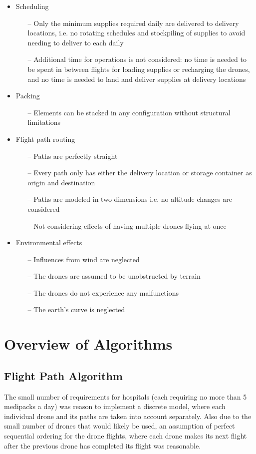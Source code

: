 \documentclass[twocolumn,10pt]{asme2ej}
\begin{document}
\begin{itemize}
	\item Scheduling
	\begin{itemize}
		\item[--] Only the minimum supplies required daily are delivered to delivery locations, i.e. no rotating schedules and stockpiling of supplies to avoid needing to deliver to each daily
		\item[--] Additional time for operations is not considered: no time is needed to be spent in between flights for loading supplies or recharging the drones, and no time is needed to land and deliver supplies at delivery locations
	\end{itemize}
    \item Packing
    \begin{itemize}
    	\item[--] Elements can be stacked in any configuration without structural limitations
    \end{itemize}
	\item Flight path routing
	\begin{itemize}
		\item[--] Paths are perfectly straight
		\item[--] Every path only has either the delivery location or storage container as origin and destination
		\item[--] Paths are modeled in two dimensions i.e. no altitude changes are considered
		\item[--] Not considering effects of having multiple drones flying at once
	\end{itemize}
	\item Environmental effects
	\begin{itemize}
		\item[--] Influences from wind are neglected
		\item[--] The drones are assumed to be unobstructed by terrain
		\item[--] The drones do not experience any malfunctions
		\item[--] The earth’s curve is neglected
	\end{itemize}
\end{itemize}


\section{Overview of Algorithms}
 
 
\subsection{Flight Path Algorithm}
The small number of requirements for hospitals (each requiring no more than 5 medipacks a day) was reason to implement a discrete model, where each individual drone and its paths are taken into account separately. Also due to the small number of drones that would likely be used, an assumption of perfect sequential ordering for the drone flights, where each drone makes its next flight after the previous drone has completed its flight was reasonable. 
\end{document}
